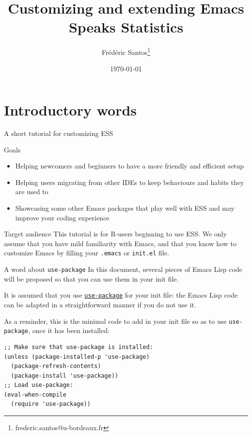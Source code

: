 \documentclass[presentation]{beamer}
\author{Frédéric Santos\thanks{frederic.santos@u-bordeaux.fr}}
\date{\today}
\title{Customizing and extending Emacs Speaks Statistics}
\begin{document}
\maketitle


\section{Introductory words}
\label{sec:org988d043}
\begin{frame}[label={sec:orgb88833b},fragile]{A short tutorial for customizing ESS}
 \begin{block}{Goals}
\begin{itemize}
\item Helping newcomers and beginners to have a more friendly and efficient setup
\item Helping users migrating from other IDEs to keep behaviours and habits they are used to
\item Showcasing some other Emacs packages that play well with ESS and may improve your coding experience
\end{itemize}
\end{block}

\begin{block}{Target audience}
This tutorial is for R-users beginning to use ESS. We only assume that you have mild familiarity with Emacs, and that you know how to customize Emacs by filling your \texttt{.emacs} or \texttt{init.el} file.
\end{block}
\end{frame}

\begin{frame}[label={sec:orge82cf25},fragile]{A word about \texttt{use-package}}
 In this document, several pieces of Emacs Lisp code will be proposed so that you can use them in your init file.

It is assumed that you use \href{https://jwiegley.github.io/use-package/}{\texttt{use-package}} for your init file: the Emacs Lisp code can be adapted in a straightforward manner if you do not use it.

As a reminder, this is the minimal code to add in your init file so as to use \texttt{use-package}, once it has been installed:

\begin{verbatim}
;; Make sure that use-package is installed:
(unless (package-installed-p 'use-package)
  (package-refresh-contents)
  (package-install 'use-package))
;; Load use-package:
(eval-when-compile
  (require 'use-package))
\end{verbatim}
\end{frame}
\end{document}
